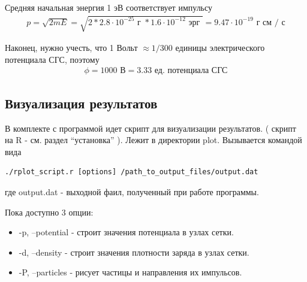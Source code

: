 Средняя начальная энергия 1 эВ соответствует импульсу
\begin{gather}
  p = \sqrt{ 2 m E } 
  = \sqrt{ 2 * 2.8 \cdot 10^{-25} \mbox{ г } * 1.6 \cdot 10^{-12} \mbox{ эрг } }
  = 9.47 \cdot 10^{-19} \mbox{ г см / с}  
\end{gather}

Наконец, нужно учесть, что 1 Вольт $\approx 1/300$ единицы электрического потенциала СГС,
поэтому 
\begin{gather}
  \phi = 1000 \mbox{ В} = 3.33 \mbox{ ед. потенциала СГС}
\end{gather}



\subsection{ Визуализация результатов }

В комплекте с программой идет скрипт для визуализации результатов.
( скрипт на R - см. раздел ``установка'' ).
Лежит в директории plot. Вызывается командой вида
\begin{verbatim}
./rplot_script.r [options] /path_to_output_files/output.dat
\end{verbatim}
где output.dat - выходной фаил, полученный при работе программы.

Пока доступно 3 опции: 
\begin{itemize}
\item -p, --potential - строит значения потенциала в узлах сетки.
\item -d, --density - строит значения плотности заряда в узлах сетки.
\item -P, --particles - рисует частицы и направления их импульсов.
\end{itemize}


